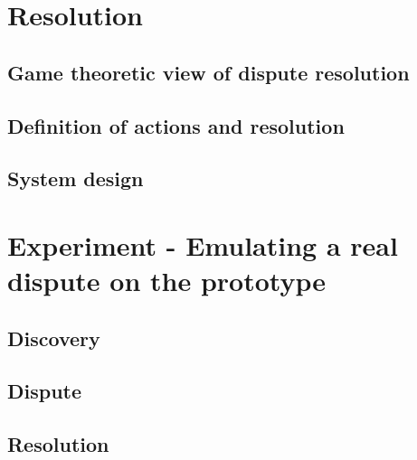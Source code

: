 \documentclass[12pt,msc,a4paper,oneside]{ucl_thesis}
\begin{document}
\chapter{Resolution}
\section{Game theoretic view of dispute resolution}
\section{Definition of actions and resolution}
\section{System design}

\chapter{Experiment - Emulating a real dispute on the prototype}
\section{Discovery}
\section{Dispute}
\section{Resolution}



\end{document}
